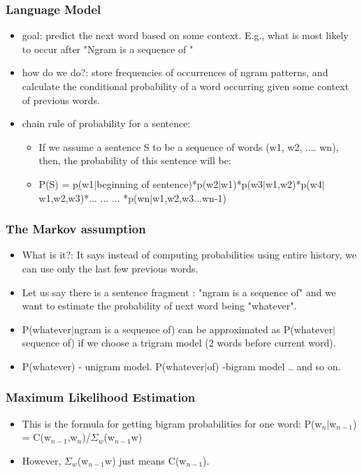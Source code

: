 \documentclass{beamer}
\begin{document}
\begin{frame}
\frametitle{Language Model}
\begin{itemize}
\item goal:  predict the next word based on some context. E.g., what is most likely to occur after "Ngram is a sequence of "
\item how do we do?: store frequencies of occurrences of ngram patterns, and calculate the conditional probability of a word occurring given some context of previous words.
\item chain rule of probability for a sentence: 
\begin{itemize}
\item If we assume a sentence S to be a sequence of words (w1, w2, .... wn), then, the probability of this sentence will be:
\item P(S) = p(w1$|$beginning of sentence)*p(w2$|$w1)*p(w3$|$w1,w2)*p(w4$|$w1,w2,w3)*... ... ... *p(wn$|$w1,w2,w3...wn-1)
\end{itemize}
\end{itemize}
\end{frame}

\begin{frame}
\frametitle{The Markov assumption}
\begin{itemize}
\item What is it?: It says instead of computing probabilities using entire history, we can use only the last few previous words.
\item Let us say there is a sentence fragment : "ngram is a sequence of" and we want to estimate the probability of next word being "whatever".
\item P(whatever$|$ngram is a sequence of) can be approximated as P(whatever$|$sequence of) if we choose a trigram model (2 words before current word).
\item P(whatever) - unigram model. P(whatever$|$of) -bigram model .. and so on. 
\end{itemize}
\end{frame}

\begin{frame}
\frametitle{Maximum Likelihood Estimation}
\begin{itemize}
\item This is the formula for getting bigram probabilities for one word: P(w$_n|$w$_{n-1}$) = C(w$_{n-1}$,w$_{n}$)/$\Sigma_w$(w$_{n-1}$w) \pause
\item However, $\Sigma_w$(w$_{n-1}$w) just means C(w$_{n-1}$). 
\end{itemize}
\end{frame}
\end{document}
